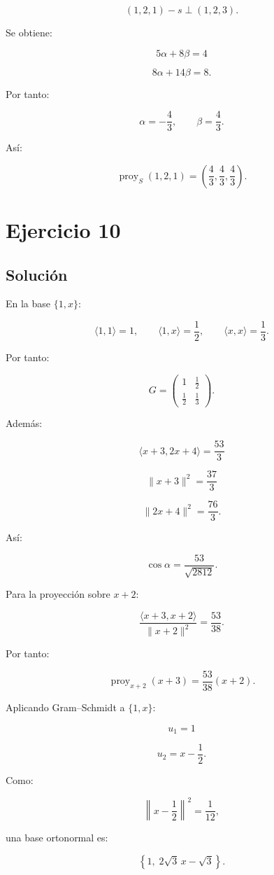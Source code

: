 \documentclass[11pt,a4paper]{article}
\newcommand{\proy}{\operatorname{proy}}
\begin{document}
\[
(1,2,1)-s
\perp
(1,2,3).
\]

Se obtiene:

\[
5\alpha+8\beta=4
\]

\[
8\alpha+14\beta=8.
\]

Por tanto:

\[
\alpha=-\frac43,
\qquad
\beta=\frac43.
\]

Así:

\[
\boxed{
\proy_S(1,2,1)
=
\left(
\frac43,\frac43,\frac43
\right).
}
\]

\section{Ejercicio 10}
\subsection{Solución}

En la base $\{1,x\}$:

\[
\langle1,1\rangle=1,
\qquad
\langle1,x\rangle=\frac12,
\qquad
\langle x,x\rangle=\frac13.
\]

Por tanto:

\[
\boxed{
G=
\begin{pmatrix}
1&\frac12\\
\frac12&\frac13
\end{pmatrix}.
}
\]

Además:

\[
\langle x+3,2x+4\rangle
=
\frac{53}{3}
\]

\[
\|x+3\|^2=\frac{37}{3}
\]

\[
\|2x+4\|^2=\frac{76}{3}.
\]

Así:

\[
\boxed{
\cos\alpha
=
\frac{53}{\sqrt{2812}}.
}
\]

Para la proyección sobre $x+2$:

\[
\frac{\langle x+3,x+2\rangle}
{\|x+2\|^2}
=
\frac{53}{38}.
\]

Por tanto:

\[
\boxed{
\proy_{x+2}(x+3)
=
\frac{53}{38}(x+2).
}
\]

Aplicando Gram--Schmidt a $\{1,x\}$:

\[
u_1=1
\]

\[
u_2=x-\frac12.
\]

Como:

\[
\left\|x-\frac12\right\|^2
=
\frac1{12},
\]

una base ortonormal es:

\[
\boxed{
\left\{
1,\;
2\sqrt3\,x-\sqrt3
\right\}.
}
\]
\end{document}
